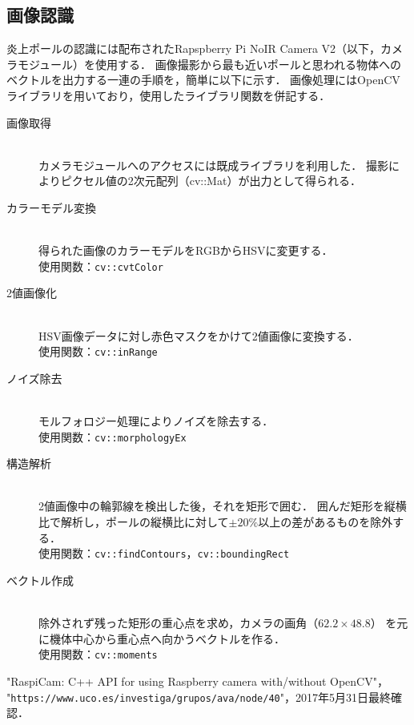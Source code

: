 \documentclass[11pt,a4paper]{jsarticle}
\begin{document}
\subsection{画像認識}
  炎上ポールの認識には配布されたRapspberry Pi NoIR Camera V2（以下，カメラモジュール）を使用する．
  画像撮影から最も近いポールと思われる物体へのベクトルを出力する一連の手順を，簡単に以下に示す．
  画像処理にはOpenCVライブラリを用いており，使用したライブラリ関数を併記する．

  \begin{description}

    \item[画像取得] \mbox{} \\
      カメラモジュールへのアクセスには既成ライブラリ\cite{raspicam}を利用した．
      撮影によりピクセル値の2次元配列（cv::Mat）が出力として得られる．\\

    \item[カラーモデル変換] \mbox{} \\
      得られた画像のカラーモデルをRGBからHSVに変更する．\\
      使用関数：\texttt{cv::cvtColor} \\

    \item[2値画像化] \mbox{} \\
      HSV画像データに対し赤色マスクをかけて2値画像に変換する．\\
      使用関数：\texttt{cv::inRange} \\

    \item[ノイズ除去] \mbox{} \\
      モルフォロジー処理によりノイズを除去する．\\
      使用関数：\texttt{cv::morphologyEx} \\

    \item[構造解析] \mbox{} \\
      2値画像中の輪郭線を検出した後，それを矩形で囲む．
      囲んだ矩形を縦横比で解析し，ポールの縦横比に対して$\pm 20 \%$以上の差があるものを除外する．\\
      使用関数：\texttt{cv::findContours}，\texttt{cv::boundingRect} \\

    \item[ベクトル作成] \mbox{} \\
      除外されず残った矩形の重心点を求め，カメラの画角（$62.2 \times 48.8$）
      を元に機体中心から重心点へ向かうベクトルを作る．\\
      使用関数：\texttt{cv::moments} \\

  \end{description}

\begin{thebibliography}{9}
   "RaspiCam: C++ API for using Raspberry camera with/without OpenCV"，\\
                     "\texttt{https://www.uco.es/investiga/grupos/ava/node/40}"，2017年5月31日最終確認．
\end{thebibliography}
\end{document}
